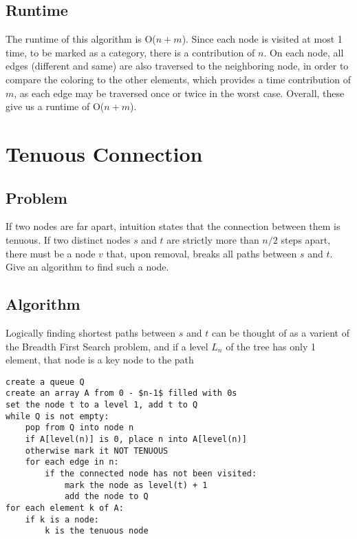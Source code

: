 \documentclass[titlepage]{article}
\numberwithin{equation}{subsection}
\begin{document}
\subsection{Runtime}
The runtime of this algorithm is O($n+m$). Since each node is visited at most
1 time, to be marked as a category, there is a contribution of $n$. On each node,
all edges (different and same) are also traversed to the neighboring node, in order to
compare the coloring to the other elements, which provides a time contribution of
$m$, as each edge may be traversed once or twice in the worst case. Overall,
these give us a runtime of O($n+m$).
\section{Tenuous Connection}
\subsection{Problem}
If two nodes are far apart, intuition states that the connection between them
is tenuous. If two distinct nodes $s$ and $t$ are strictly more than $n/2$ steps apart,
there must be a node $v$ that, upon removal, breaks all paths between $s$ and $t$.
Give an algorithm to find such a node.
\subsection{Algorithm}
Logically finding shortest paths between $s$ and $t$ can be thought of
as a varient of the Breadth First Search problem, and if a level $L_n$ of
the tree has only 1 element, that node is a key node to the path
\begin{lstlisting}
create a queue Q
create an array A from 0 - $n-1$ filled with 0s
set the node t to a level 1, add t to Q
while Q is not empty:
    pop from Q into node n
    if A[level(n)] is 0, place n into A[level(n)]
    otherwise mark it NOT TENUOUS
    for each edge in n:
        if the connected node has not been visited:
            mark the node as level(t) + 1
            add the node to Q
for each element k of A:
    if k is a node:
        k is the tenuous node
\end{lstlisting}
\end{document}
